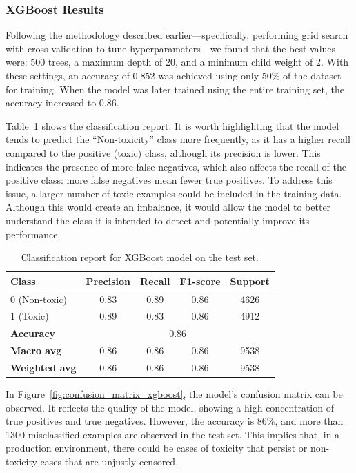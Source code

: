 \subsubsection{XGBoost Results}

Following the methodology described earlier—specifically, performing grid search with cross-validation to tune hyperparameters—we found that the best values were: 500 trees, a maximum depth of 20, and a minimum child weight of 2. With these settings, an accuracy of 0.852 was achieved using only 50\% of the dataset for training. When the model was later trained using the entire training set, the accuracy increased to 0.86.

Table~\ref{tab:xgboost_classification_report} shows the classification report. It is worth highlighting that the model tends to predict the “Non-toxicity” class more frequently, as it has a higher recall compared to the positive (toxic) class, although its precision is lower. This indicates the presence of more false negatives, which also affects the recall of the positive class: more false negatives mean fewer true positives. To address this issue, a larger number of toxic examples could be included in the training data. Although this would create an imbalance, it would allow the model to better understand the class it is intended to detect and potentially improve its performance.

\begin{table}[htbp]
\centering
\caption{Classification report for XGBoost model on the test set.}
\label{tab:xgboost_classification_report}
\begin{tabular}{lcccc}
\toprule
\textbf{Class} & \textbf{Precision} & \textbf{Recall} & \textbf{F1-score} & \textbf{Support} \\
\midrule
0 (Non-toxic)   & 0.83 & 0.89 & 0.86 & 4626 \\
1 (Toxic)       & 0.89 & 0.83 & 0.86 & 4912 \\
\midrule
\textbf{Accuracy}       & \multicolumn{4}{c}{0.86} & 9538 \\
\textbf{Macro avg}      & 0.86 & 0.86 & 0.86 & 9538 \\
\textbf{Weighted avg}   & 0.86 & 0.86 & 0.86 & 9538 \\
\bottomrule
\end{tabular}
\end{table}

In Figure~\ref{fig:confusion_matrix_xgboost}, the model's confusion matrix can be observed. It reflects the quality of the model, showing a high concentration of true positives and true negatives. However, the accuracy is 86\%, and more than 1300 misclassified examples are observed in the test set. This implies that, in a production environment, there could be cases of toxicity that persist or non-toxicity cases that are unjustly censored.

